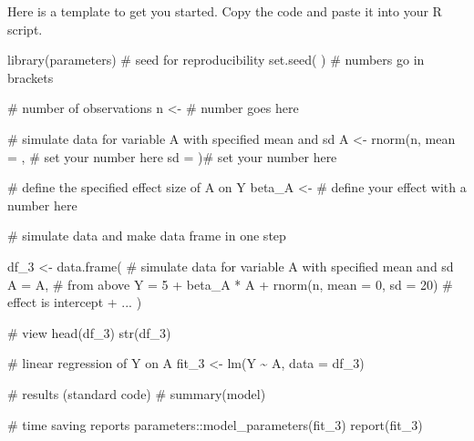 \documentclass[
  singlecolumn]{article}
\newenvironment{Shaded}{}{}
\newcommand{\AttributeTok}[1]{\textcolor[rgb]{0.84,0.23,0.29}{#1}}
\newcommand{\CommentTok}[1]{\textcolor[rgb]{0.42,0.45,0.49}{#1}}
\newcommand{\DecValTok}[1]{\textcolor[rgb]{0.00,0.36,0.77}{#1}}
\newcommand{\FunctionTok}[1]{\textcolor[rgb]{0.44,0.26,0.76}{#1}}
\newcommand{\NormalTok}[1]{\textcolor[rgb]{0.14,0.16,0.18}{#1}}
\newcommand{\OtherTok}[1]{\textcolor[rgb]{0.44,0.26,0.76}{#1}}
\newcommand{\SpecialCharTok}[1]{\textcolor[rgb]{0.00,0.36,0.77}{#1}}
\theoremstyle{definition}
\theoremstyle{remark}
\begin{document}
Here is a template to get you started. Copy the code and paste it into
your R script.

\begin{Shaded}
\begin{Highlighting}[]
\FunctionTok{library}\NormalTok{(parameters)}
\CommentTok{\#  seed for reproducibility}
\FunctionTok{set.seed}\NormalTok{( ) }\CommentTok{\# numbers go in brackets}

\CommentTok{\# number of observations}
\NormalTok{n }\OtherTok{\textless{}{-}}   \CommentTok{\# number goes here}

\CommentTok{\# simulate data for variable A with specified mean and sd}
\NormalTok{A }\OtherTok{\textless{}{-}} \FunctionTok{rnorm}\NormalTok{(n, }
           \AttributeTok{mean =}\NormalTok{ , }\CommentTok{\# set your number here }
           \AttributeTok{sd =}\NormalTok{ )}\CommentTok{\# set your number here }

\CommentTok{\# define the specified effect size of A on Y}
\NormalTok{beta\_A }\OtherTok{\textless{}{-}}   \CommentTok{\# define your effect with a number here }


\CommentTok{\# simulate data and make data frame in one step}

\NormalTok{df\_3 }\OtherTok{\textless{}{-}} \FunctionTok{data.frame}\NormalTok{(}
  \CommentTok{\# simulate data for variable A with specified mean and sd}
  \AttributeTok{A =}\NormalTok{ A, }\CommentTok{\# from above}
  \AttributeTok{Y =} \DecValTok{5} \SpecialCharTok{+}\NormalTok{ beta\_A }\SpecialCharTok{*}\NormalTok{ A }\SpecialCharTok{+} \FunctionTok{rnorm}\NormalTok{(n, }\AttributeTok{mean =} \DecValTok{0}\NormalTok{, }\AttributeTok{sd =} \DecValTok{20}\NormalTok{) }\CommentTok{\#  effect is intercept + ...}
\NormalTok{)}

\CommentTok{\# view}
\FunctionTok{head}\NormalTok{(df\_3)}
\FunctionTok{str}\NormalTok{(df\_3)}

\CommentTok{\#  linear regression of Y on A}
\NormalTok{fit\_3 }\OtherTok{\textless{}{-}} \FunctionTok{lm}\NormalTok{(Y }\SpecialCharTok{\textasciitilde{}}\NormalTok{ A, }\AttributeTok{data =}\NormalTok{ df\_3)}

\CommentTok{\#  results (standard code)}
\CommentTok{\# summary(model)}

\CommentTok{\# time saving reports}
\NormalTok{parameters}\SpecialCharTok{::}\FunctionTok{model\_parameters}\NormalTok{(fit\_3)}
\FunctionTok{report}\NormalTok{(fit\_3)}
\end{Highlighting}
\end{Shaded}
\end{document}
